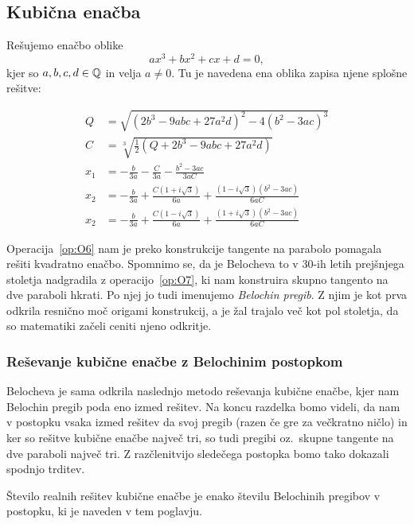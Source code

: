 \subsection{Kubična enačba}
\label{podpogl:kubicna_enacba}

Rešujemo enačbo oblike
$$ a x^3 + b x^2 + c x + d = 0, $$
kjer so $a, b, c, d \in \mathbb Q$ in velja $a \neq 0$. Tu je navedena ena oblika zapisa njene splošne rešitve:

\begin{align*}
    Q &= \sqrt{(2b^3 - 9abc + 27a^2d)^2 - 4(b^2 - 3ac)^3} \\
    C &= \sqrt[3]{\frac{1}{2}(Q + 2b^3 - 9abc + 27a^2d)} \\
    x_1 &= - \frac{b}{3a} - \frac{C}{3a} - \frac{b^2 - 3ac}{3aC} \\
    x_2 &= - \frac{b}{3a} + \frac{C(1 + i\sqrt{3})}{6a} + \frac{(1 - i\sqrt{3})(b^2 - 3ac)}{6aC} \\
    x_2 &= - \frac{b}{3a} + \frac{C(1 - i\sqrt{3})}{6a} + \frac{(1 + i\sqrt{3})(b^2 - 3ac)}{6aC}
\end{align*}

Operacija~\ref{op:O6} nam je preko konstrukcije tangente na parabolo pomagala rešiti kvadratno enačbo. Spomnimo se, da je Belocheva to v 30-ih letih prejšnjega stoletja nadgradila z operacijo~\ref{op:O7}, ki nam konstruira skupno tangento na dve paraboli hkrati. Po njej jo tudi imenujemo \emph{Belochin pregib}. Z njim je kot prva odkrila resnično moč origami konstrukcij, a je žal trajalo več kot pol stoletja, da so matematiki začeli ceniti njeno odkritje.

\subsubsection{Reševanje kubične enačbe z Belochinim postopkom}

Belocheva je sama odkrila naslednjo metodo reševanja kubične enačbe, kjer nam Belochin pregib poda eno izmed rešitev. Na koncu razdelka bomo videli, da nam v postopku vsaka izmed rešitev da svoj pregib (razen če gre za večkratno ničlo) in ker so rešitve kubične enačbe največ tri, so tudi pregibi oz.\ skupne tangente na dve paraboli največ tri. Z razčlenitvijo sledečega postopka bomo tako dokazali spodnjo trditev.

\begin{trditev}
    \label{trd:stevilo_skupnih_tangent}
    Število realnih rešitev kubične enačbe je enako številu Belochinih pregibov v postopku, ki je naveden v tem poglavju.
\end{trditev}

